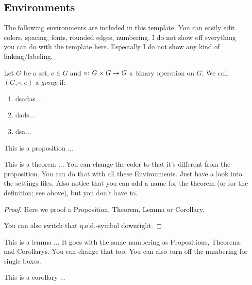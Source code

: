 \documentclass[11pt, a4paper]{article}
\begin{document}
\subsection{Environments}

The following environments are included in this template. You can easily edit colors, spacing, fonts, rounded edges, numbering.
I do not show off everything you can do with the template here. Especially I do not show any kind of linking/labeling.

\begin{definition}[Group]
  Let $G$ be a set, $e \in G$ and $\circ \colon G \times G \to G$ a binary operation on $G$. We call $(G, \circ, e)$ a \emph{group} if:

  \begin{enumerate}[(G1)]
  \item dsadas...
  \item dads...
  \item dsa...
  \end{enumerate}
\end{definition}

\begin{proposition}
  This is a proposition ...
\end{proposition}

\begin{theorem}
  This is a theorem ...
  You can change the color to that it's different from the proposition. You can do that with all these Environments. Just have a look into the settings files. Also notice that you can add a name for the theorem (or for the definition; see above), but you don't have to.
\end{theorem}

\begin{proof}
  Here we proof a Proposition, Theorem, Lemma or Corollary.

  You can also switch that q.e.d.-symbol downright.
\end{proof}

\begin{lemma}
  This is a lemma ...
  It goes with the same numbering as Propositions, Theorems and Corollarys. You can change that too. You can also turn off the numbering for single boxes.
\end{lemma}

\begin{corollary}
  This is a corollary ...
\end{corollary}
\end{document}
